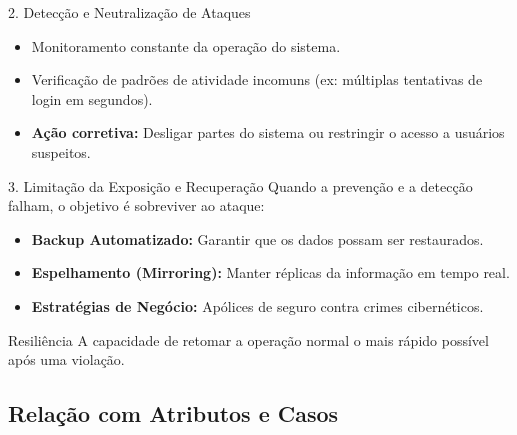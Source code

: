 \documentclass[aspectratio=169]{beamer}
\begin{document}
\begin{frame}{2. Detecção e Neutralização de Ataques}
    \begin{itemize}
        \item Monitoramento constante da operação do sistema.
        \item Verificação de padrões de atividade incomuns (ex: múltiplas tentativas de login em segundos).
        \item \textbf{Ação corretiva:} Desligar partes do sistema ou restringir o acesso a usuários suspeitos.
    \end{itemize}
    \centering
\end{frame}

\begin{frame}{3. Limitação da Exposição e Recuperação}
    Quando a prevenção e a detecção falham, o objetivo é sobreviver ao ataque:
    \begin{itemize}
        \item \textbf{Backup Automatizado:} Garantir que os dados possam ser restaurados.
        \item \textbf{Espelhamento (Mirroring):} Manter réplicas da informação em tempo real.
        \item \textbf{Estratégias de Negócio:} Apólices de seguro contra crimes cibernéticos.
    \end{itemize}
    \begin{alertblock}{Resiliência}
        A capacidade de retomar a operação normal o mais rápido possível após uma violação.
    \end{alertblock}
\end{frame}

\subsection{Relação com Atributos e Casos}
\end{document}
